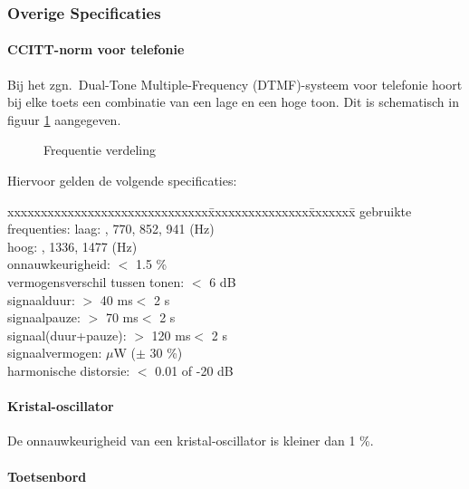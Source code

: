 \subsubsection{Overige Specificaties}

\paragraph{CCITT-norm voor telefonie}

Bij het zgn.\ Dual-Tone Multiple-Frequency (DTMF)-systeem voor telefonie hoort bij elke toets een combinatie van een lage en een hoge toon.
Dit is schematisch in figuur \ref{CCITT} aangegeven. 

\begin{figure}[h]
\centerline{}
\caption{Frequentie verdeling}
\label{CCITT}
\end{figure}

Hiervoor gelden de volgende specificaties:
\begin{tabbing}
xxxxxxxxxxxxxxxxxxxxxxxxxxxxxx\=xxxxxxxxxxxxxxx\=xxxxxxx\=\kill
gebruikte frequenties: 	\>laag: 	, 770, 852, 941 (Hz)\\
			\>hoog:		, 1336, 1477 (Hz)\\
onnauwkeurigheid:	\>$<$ 1.5 \%	\\
vermogensverschil tussen tonen:  	\>$<$ 6 dB\\
signaalduur:		\>$>$ 40 ms\>$<$ 2 s\\
signaalpauze:		\>$>$ 70 ms\>$<$ 2 s\\
signaal(duur+pauze):	\>$>$ 120 ms\>$<$ 2 s\\
signaalvermogen:	 $\mu\!$W ($\pm$ 30 \%)\\
harmonische distorsie:	\>$<$ 0.01 of -20 dB\\
\end{tabbing}

\paragraph{Kristal-oscillator}

De onnauwkeurigheid van een kristal-oscillator is kleiner dan 1 \%.



\paragraph{Toetsenbord}

